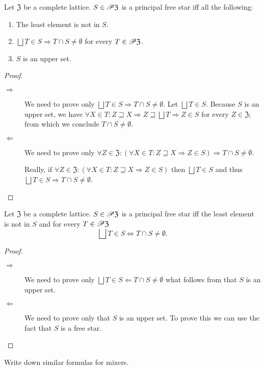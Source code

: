 \begin{prop}
Let $\mathfrak{Z}$ be a complete lattice. $S\in\mathscr{P}\mathfrak{Z}$ is a principal
free star iff all the following:
\begin{enumerate}
\item The least element is not in $S$.
\item $\bigsqcup T\in S\Rightarrow T\cap S\neq\emptyset$ for every $T\in\mathscr{P}\mathfrak{Z}$.
\item $S$ is an upper set.
\end{enumerate}
\end{prop}
\begin{proof}
~
\begin{description}
\item [{$\Rightarrow$}] We need to prove only $\bigsqcup T\in S\Rightarrow T\cap S\neq\emptyset$.
Let $\bigsqcup T\in S$. Because $S$ is an upper set, we have $\forall X\in T:Z\sqsupseteq X\Rightarrow Z\sqsupseteq\bigsqcup T\Rightarrow Z\in S$
for every $Z\in\mathfrak{Z}$;
from which we conclude $T\cap S\neq\emptyset$.
\item [{$\Leftarrow$}] We need to prove only $\forall Z\in\mathfrak{Z}:(\forall X\in T:Z\sqsupseteq X\Rightarrow Z\in S)\Rightarrow T\cap S\neq\emptyset$.


Really, if $\forall Z\in\mathfrak{Z}:(\forall X\in T:Z\sqsupseteq X\Rightarrow Z\in S)$
then $\bigsqcup T\in S$ and thus $\bigsqcup T\in S\Rightarrow T\cap S\neq\emptyset$.

\end{description}
\end{proof}
\begin{prop}
Let $\mathfrak{Z}$ be a complete lattice. $S\in\mathscr{P}\mathfrak{Z}$
is a principal free star iff the least element is not
in $S$ and for every $T\in\mathscr{P}\mathfrak{Z}$ 
\[
\bigsqcup T\in S\Leftrightarrow T\cap S\neq\emptyset.
\]
\end{prop}
\begin{proof}
~
\begin{description}
\item [{$\Rightarrow$}] We need to prove only $\bigsqcup T\in S\Leftarrow T\cap S\neq\emptyset$
what follows from that $S$ is an upper set.
\item [{$\Leftarrow$}] We need to prove only that $S$ is an upper set.
To prove this we can use the fact that $S$ is a free star.
\end{description}
\end{proof}
\begin{xca}
Write down similar formulas for mixers.
\end{xca}

